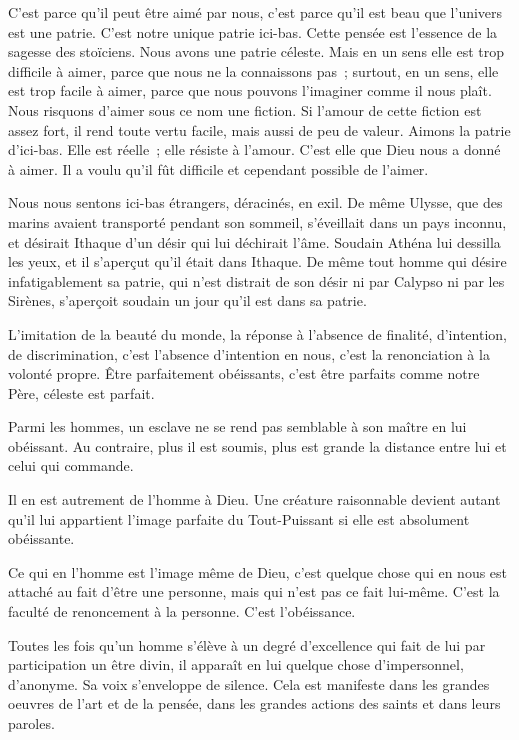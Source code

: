 \documentclass[french,twoside]{book} %
\begin{document}
C'est parce qu'il peut être aimé par nous, c'est parce qu'il est beau que l'univers est une patrie. C'est notre unique patrie ici-bas. Cette pensée est l'essence de la sagesse des stoïciens. Nous avons une patrie céleste. Mais en un sens elle est trop difficile à aimer, parce que nous ne la connaissons pas ; surtout, en un sens, elle est trop facile à aimer, parce que nous pouvons l'imaginer comme il nous plaît. Nous risquons d'aimer sous ce nom une fiction. Si l'amour de cette fiction est assez fort, il rend toute vertu facile, mais aussi de peu de valeur. Aimons la patrie d'ici-bas. Elle est réelle ; elle résiste à l'amour. C'est elle que Dieu nous a donné à aimer. Il a voulu qu'il fût difficile et cependant possible de l'aimer.\par
Nous nous sentons ici-bas étrangers, déracinés, en exil. De même Ulysse, que des marins avaient transporté pendant son sommeil, s'éveillait dans un pays inconnu, et désirait Ithaque d'un désir qui lui déchirait l'âme. Soudain Athéna lui dessilla les yeux, et il s'aperçut qu'il était dans Ithaque. De même tout homme qui désire infatigablement sa patrie, qui n'est distrait de son désir ni par Calypso ni par les Sirènes, s'aperçoit soudain un jour qu'il est dans sa patrie.\par
L'imitation de la beauté du monde, la réponse à l'absence de finalité, d'intention, de discrimination, c'est l'absence d'intention en nous, c'est la renonciation à la volonté propre. Être parfaitement obéissants, c'est être parfaits comme notre Père, céleste est parfait.\par
Parmi les hommes, un esclave ne se rend pas semblable à son maître en lui obéissant. Au contraire, plus il est soumis, plus est grande la distance entre lui et celui qui commande.\par
Il en est autrement de l'homme à Dieu. Une créature raisonnable devient autant qu'il lui appartient l'image parfaite du Tout-Puissant si elle est absolument obéissante.\par
Ce qui en l'homme est l'image même de Dieu, c'est quelque chose qui en nous est attaché au fait d'être une personne, mais qui n'est pas ce fait lui-même. C'est la faculté de renoncement à la personne. C'est l'obéissance.\par
Toutes les fois qu'un homme s'élève à un degré d'excellence qui fait de lui par participation un être divin, il apparaît en lui quelque chose d'impersonnel, d'anonyme. Sa voix s'enveloppe de silence. Cela est manifeste dans les grandes oeuvres de l'art et de la pensée, dans les grandes actions des saints et dans leurs paroles.\par
\end{document}
